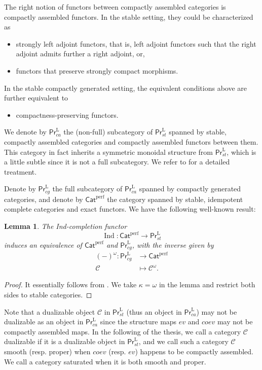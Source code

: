 \documentclass{article}
\newtheorem{lm}[thm]{Lemma}
\theoremstyle{definition}
\newcommand{\on}{\operatorname}
\newcommand{\PrL}{\mathsf{Pr}^\mathrm{L} }
\begin{document}
The right notion of functors between compactly assembled categories is compactly assembled functors. In the stable setting, they could be characterized as 
\begin{itemize}
\item strongly left adjoint functors, that is, left adjoint functors such that the right adjoint admits further a right adjoint, or,
\item functors that preserve strongly compact morphisms.
\end{itemize}
In the stable compactly generated setting, the equivalent conditions above are further equivalent to
\begin{itemize}
\item compactness-preserving functors.
\end{itemize}
We denote by $\PrL_{ca}$ the (non-full) subcategory of $\PrL_{st}$ spanned by stable, compactly assembled categories and compactly assembled functors between them. This category in fact inherits a symmetric monoidal structure from $\PrL_{st}$, which is a little subtle since it is not a full subcategory. We refer to \cite[Section 2.9]{KNP} for a detailed treatment.


Denote by $\PrL_{cg}$ the full subcategory of $\PrL_{ca}$ spanned by compactly generated categories, and denote by $\mathsf{Cat}^{\on{perf}}$ the category spanned by stable, idempotent complete categories and exact functors. We have the following well-known result:
\begin{lm}
The Ind-completion functor\[
\on{Ind}:\mathsf{Cat}^{\on{perf}}\rightarrow\PrL_{st}\]
induces an equivalence of $\mathsf{Cat}^{\on{perf}}$ and $\PrL_{cg}$, with the inverse given by\[
\begin{aligned}
(-)^\omega:\PrL_{cg}&\rightarrow\mathsf{Cat}^{\on{perf}}\\
\mathcal{C}&\mapsto\mathcal{C}^\omega.
\end{aligned}\]
\end{lm}
\begin{proof}
It essentially follows from \cite[Lemma 5.3.2.9]{HTT}. We take $\kappa=\omega$ in the lemma and restrict both sides to stable categories.
\end{proof}
Note that a dualizable object $\mathcal{C}$ in $\PrL_{st}$ (thus an object in $\PrL_{ca}$) may not be dualizable as an object in $\PrL_{ca}$ since the structure maps $ev$ and $coev$ may not be compactly assembled maps. In the following of the thesis, we call a category $\mathcal{C}$ dualizable if it is a dualizable object in $\PrL_{st}$, and we call such a category $\mathcal{C}$ smooth (resp. proper) when $coev$ (resp. $ev$) happens to be compactly assembled. We call a category saturated when it is both smooth and proper.\\
\end{document}
